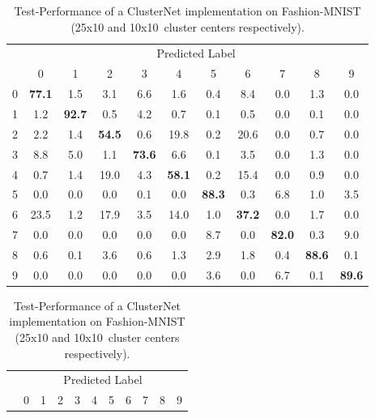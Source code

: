 \documentclass{article}
\begin{document}
\begin{table}[hbt!]
    \caption{Test-Performance of a ClusterNet implementation on Fashion-MNIST (25x10 and 10x10~cluster centers respectively).}
    \begin{subtable}{0.5\linewidth}
        \centering
        \scriptsize
        \tabcolsep=0.11cm
        \begin{tabular}{c| c c c c c c c c c c |}
            & \multicolumn{10}{c}{Predicted Label} \\
            & 0 & 1 & 2 & 3 & 4 & 5 & 6 & 7 & 8 & 9 \\ 
          \hline
            0 & \textbf{77.1} & 1.5 & 3.1 & 6.6 & 1.6 & 0.4 & 8.4 & 0.0 & 1.3 & 0.0 \\
            1 & 1.2 & \textbf{92.7} & 0.5 & 4.2 & 0.7 & 0.1 & 0.5 & 0.0 & 0.1 & 0.0 \\
            2 & 2.2 & 1.4 & \textbf{54.5} & 0.6 & 19.8 & 0.2 & 20.6 & 0.0 & 0.7 & 0.0 \\
            3 & 8.8 & 5.0 & 1.1 & \textbf{73.6} & 6.6 & 0.1 & 3.5 & 0.0 & 1.3 & 0.0 \\
            4 & 0.7 & 1.4 & 19.0 & 4.3 & \textbf{58.1} & 0.2 & 15.4 & 0.0 & 0.9 & 0.0 \\
            5 & 0.0 & 0.0 & 0.0 & 0.1 & 0.0 & \textbf{88.3} & 0.3 & 6.8 & 1.0 & 3.5 \\
            6 & 23.5 & 1.2 & 17.9 & 3.5 & 14.0 & 1.0 & \textbf{37.2} & 0.0 & 1.7 & 0.0 \\
            7 & 0.0 & 0.0 & 0.0 & 0.0 & 0.0 & 8.7 & 0.0 & \textbf{82.0} & 0.3 & 9.0 \\
            8 & 0.6 & 0.1 & 3.6 & 0.6 & 1.3 & 2.9 & 1.8 & 0.4 & \textbf{88.6} & 0.1 \\
            9 & 0.0 & 0.0 & 0.0 & 0.0 & 0.0 & 3.6 & 0.0 & 6.7 & 0.1 & \textbf{89.6}
        \end{tabular}
         \label{tab:fmnist1}
  \end{subtable}
  \begin{subtable}{0.5\linewidth}
        \centering
        \scriptsize
        \tabcolsep=0.11cm
        \begin{tabular}{c| c c c c c c c c c c |}
            & \multicolumn{10}{c}{Predicted Label} \\
            & 0 & 1 & 2 & 3 & 4 & 5 & 6 & 7 & 8 & 9\\ 

\end{tabular}
\end{subtable}
\end{table}
\end{document}

